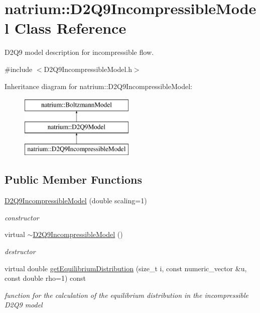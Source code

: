 \hypertarget{classnatrium_1_1D2Q9IncompressibleModel}{\section{natrium\-:\-:D2\-Q9\-Incompressible\-Model Class Reference}
\label{classnatrium_1_1D2Q9IncompressibleModel}
}


D2\-Q9 model description for incompressible flow.  




{\ttfamily \#include $<$D2\-Q9\-Incompressible\-Model.\-h$>$}

Inheritance diagram for natrium\-:\-:D2\-Q9\-Incompressible\-Model\-:\begin{figure}[H]
\begin{center}
\leavevmode
\includegraphics[height=3.000000cm]{classnatrium_1_1D2Q9IncompressibleModel}
\end{center}
\end{figure}
\subsection*{Public Member Functions}
\begin{DoxyCompactItemize}
\item 
\hypertarget{classnatrium_1_1D2Q9IncompressibleModel_a2ebdd3442edd4e3f38798a99b8413fcb}{\hyperlink{classnatrium_1_1D2Q9IncompressibleModel_a2ebdd3442edd4e3f38798a99b8413fcb}{D2\-Q9\-Incompressible\-Model} (double scaling=1)}\label{classnatrium_1_1D2Q9IncompressibleModel_a2ebdd3442edd4e3f38798a99b8413fcb}

\begin{DoxyCompactList}\small\item\em constructor \end{DoxyCompactList}\item 
virtual \hyperlink{classnatrium_1_1D2Q9IncompressibleModel_a6e757941f7ca2c5a6148893147211724}{$\sim$\-D2\-Q9\-Incompressible\-Model} ()
\begin{DoxyCompactList}\small\item\em destructor \end{DoxyCompactList}\item 
virtual double \hyperlink{classnatrium_1_1D2Q9IncompressibleModel_ad1b04ceb9e277f07f1b8dfd26b30eea5}{get\-Equilibrium\-Distribution} (size\-\_\-t i, const numeric\-\_\-vector \&u, const double rho=1) const 
\begin{DoxyCompactList}\small\item\em function for the calculation of the equilibrium distribution in the incompressible D2\-Q9 model \end{DoxyCompactList}\end{DoxyCompactItemize}

